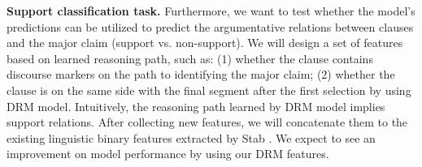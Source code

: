 
\textbf{Support classification task.}  Furthermore, we want to test whether the model's predictions can be utilized to predict the argumentative relations between clauses and the major claim (support vs. non-support). We will design a set of features based on learned reasoning path, such as: (1) whether the clause contains discourse markers on the path to identifying the major claim; (2) whether the clause is on the same side with the final segment after the first selection by using DRM model. Intuitively, the reasoning path learned by DRM model implies support relations. After collecting new features, we will concatenate them to the existing linguistic binary features extracted by Stab \cite{DBLP:conf/emnlp/StabG14}. We expect to see an improvement on model performance by using our DRM features.